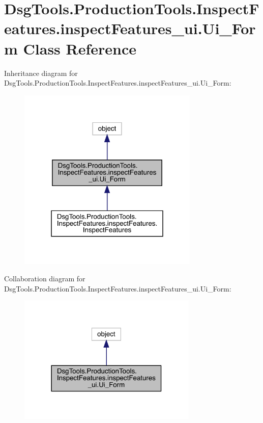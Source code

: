 \hypertarget{class_dsg_tools_1_1_production_tools_1_1_inspect_features_1_1inspect_features__ui_1_1_ui___form}{}\section{Dsg\+Tools.\+Production\+Tools.\+Inspect\+Features.\+inspect\+Features\+\_\+ui.\+Ui\+\_\+\+Form Class Reference}
\label{class_dsg_tools_1_1_production_tools_1_1_inspect_features_1_1inspect_features__ui_1_1_ui___form}


Inheritance diagram for Dsg\+Tools.\+Production\+Tools.\+Inspect\+Features.\+inspect\+Features\+\_\+ui.\+Ui\+\_\+\+Form\+:
\nopagebreak
\begin{figure}[H]
\begin{center}
\leavevmode
\includegraphics[width=244pt]{class_dsg_tools_1_1_production_tools_1_1_inspect_features_1_1inspect_features__ui_1_1_ui___form__inherit__graph}
\end{center}
\end{figure}


Collaboration diagram for Dsg\+Tools.\+Production\+Tools.\+Inspect\+Features.\+inspect\+Features\+\_\+ui.\+Ui\+\_\+\+Form\+:
\nopagebreak
\begin{figure}[H]
\begin{center}
\leavevmode
\includegraphics[width=242pt]{class_dsg_tools_1_1_production_tools_1_1_inspect_features_1_1inspect_features__ui_1_1_ui___form__coll__graph}
\end{center}
\end{figure}

